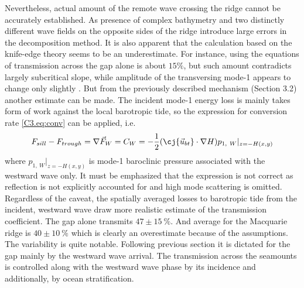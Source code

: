 \documentclass[12pt]{article}
\begin{document}
Nevertheless, actual amount of the remote wave crossing the ridge cannot be accurately established. 
As presence of complex bathymetry and two distinctly different wave fields on the opposite sides of 
the ridge introduce large errors in the decomposition method. It is also apparent that the 
calculation based on the knife-edge theory seems to be an underestimate. For instance, 
using the equations of \citep{larsen1969internal} transmission across the gap alone is about 
$15\%$, but such amount contradicts largely subcritical slope, while amplitude of the transversing 
mode-1 appears to change only slightly . But from the previously 
described mechanism (Section 3.2) another estimate can be made. The incident mode-1 energy loss is 
mainly takes form of work against the local barotropic tide, so the expression for conversion rate 
\eqref{C3.eq:conv} can be applied, i.e.
\begin{equation}
F_{sill} - F_{trough} = \nabla \vec{F}_W = C_W = -\frac{1}{2}(\cj{\vec{u}_{bt}} \cdot \nabla H) 
p_{1,~W}|_{z = -H(x,y)}
\end{equation}
where $p_{1,~W}|_{z = -H(x,y)}$ is mode-1 baroclinic pressure associated with the westward wave 
only. It must be emphasized that the expression is not correct as reflection is not explicitly 
accounted for and high mode scattering is omitted. Regardless of the caveat, the spatially averaged 
losses to barotropic tide from the incident, westward wave  draw more 
realistic estimate of the transmission coefficient. The gap alone transmits $47 \pm 15~\%$. And 
average for the Macquarie ridge is $40 \pm 10~\%$ which is clearly an overestimate because of the 
assumptions. The variability is quite notable. Following previous section it is dictated for 
the gap mainly by the westward wave arrival. The transmission across the seamounts is controlled 
along with the westward wave phase by its incidence and additionally, by ocean stratification.\\
\end{document}
